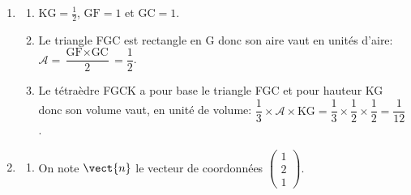 \begin{enumerate}
$\vectt{CF}$ et $\vectt{CK}$ ont pour coordonnées respectives
$\begin{pmatrix}
x_{\text F}-x_{\text C} \\ y_{\text F}-y_{\text C} \\ z_{\text F}-z_{\text C} 
\end{pmatrix}
=
\begin{pmatrix}
-1 \\ 0 \\ 1
\end{pmatrix}$
et
$\begin{pmatrix}
x_{\text K}-x_{\text C} \\ y_{\text K}-y_{\text C} \\ z_{\text K}-z_{\text C} 
\end{pmatrix}
=
\begin{pmatrix}
0 \\ -\frac{1}{2} \\ 1
\end{pmatrix}$.

Donc les vecteurs $\vectt{CF}$ et $\vectt{CK}$ ne sont pas colinéaires donc les points C, F et K ne sont pas alignés, et donc ces trois points définissent un plan.

\item 
	\begin{enumerate}
		\item $\text{KG}=\frac{1}{2}$, $\text{GF}=1$ et $\text{GC}=1$.
		\item Le triangle FGC est rectangle en G donc son aire vaut en unités d'aire:\\
		$\mathcal{A}=\dfrac{\text{GF}\times\text{GC}}{2}=\dfrac{1}{2}$.
		\item Le tétraèdre FGCK a pour base le triangle FGC et pour hauteur KG donc son volume vaut, en unité de volume:	
		$\dfrac{1}{3}\times \mathcal{A}\times \text{KG}=\dfrac{1}{3}\times \dfrac{1}{2}\times\dfrac{1}{2}=\dfrac{1}{12}$.
	\end{enumerate}

\item 
	\begin{enumerate}
		\item On note $\vect{n}$ le vecteur de coordonnées $\begin{pmatrix}1\\2\\1\end{pmatrix}$.
		




\end{enumerate}
\end{enumerate}
